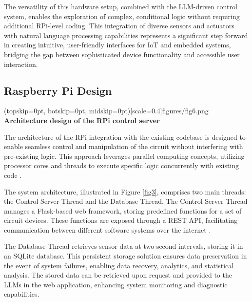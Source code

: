 \documentclass{ieeeaccess}
\begin{document}
The versatility of this hardware setup, combined with the LLM-driven control system, enables the exploration of complex, conditional logic without requiring additional RPi-level coding. This integration of diverse sensors and actuators with natural language processing capabilities represents a significant step forward in creating intuitive, user-friendly interfaces for IoT and embedded systems, bridging the gap between sophisticated device functionality and accessible user interaction.

\subsection{Raspberry Pi Design}

\Figure[t!](topskip=0pt, botskip=0pt,
midskip=0pt)[scale=0.4]{{figures/fig6.png}}
{ \textbf{Architecture design of the RPi control server}\label{fig3}}

The architecture of the RPi integration with the existing codebase is designed to enable seamless control and manipulation of the circuit without interfering with pre-existing logic. This approach leverages parallel computing concepts, utilizing processor cores and threads to execute specific logic concurrently with existing code \cite{wilkinson2005parallel}.

The system architecture, illustrated in Figure  \ref{fig3}, comprises two main threads: the Control Server Thread and the Database Thread. The Control Server Thread manages a Flask-based web framework, storing predefined functions for a set of circuit devices. These functions are exposed through a REST API, facilitating communication between different software systems over the internet \cite{Surwase2016RESTAM}.

The Database Thread retrieves sensor data at two-second intervals, storing it in an SQLite database. This persistent storage solution ensures data preservation in the event of system failures, enabling data recovery, analytics, and statistical analysis. The stored data can be retrieved upon request and provided to the LLMs in the web application, enhancing system monitoring and diagnostic capabilities.
\end{document}
